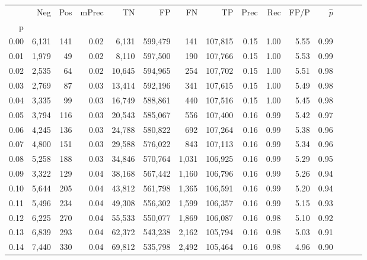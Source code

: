 \begin{tabular}{rrrrrrrrrrrrrrr}
\toprule
{} &     Neg &    Pos & mPrec &       TN &       FP &       FN &       TP &  Prec &   Rec &  FP/P & $\hat{p}$ \\
p    &         &        &       &          &          &          &          &       &       &       &           \\
\midrule
0.00 &   6,131 &    141 &  0.02 &    6,131 &  599,479 &      141 &  107,815 &  0.15 &  1.00 &  5.55 &      0.99 \\
0.01 &   1,979 &     49 &  0.02 &    8,110 &  597,500 &      190 &  107,766 &  0.15 &  1.00 &  5.53 &      0.99 \\
0.02 &   2,535 &     64 &  0.02 &   10,645 &  594,965 &      254 &  107,702 &  0.15 &  1.00 &  5.51 &      0.98 \\
0.03 &   2,769 &     87 &  0.03 &   13,414 &  592,196 &      341 &  107,615 &  0.15 &  1.00 &  5.49 &      0.98 \\
0.04 &   3,335 &     99 &  0.03 &   16,749 &  588,861 &      440 &  107,516 &  0.15 &  1.00 &  5.45 &      0.98 \\
0.05 &   3,794 &    116 &  0.03 &   20,543 &  585,067 &      556 &  107,400 &  0.16 &  0.99 &  5.42 &      0.97 \\
0.06 &   4,245 &    136 &  0.03 &   24,788 &  580,822 &      692 &  107,264 &  0.16 &  0.99 &  5.38 &      0.96 \\
0.07 &   4,800 &    151 &  0.03 &   29,588 &  576,022 &      843 &  107,113 &  0.16 &  0.99 &  5.34 &      0.96 \\
0.08 &   5,258 &    188 &  0.03 &   34,846 &  570,764 &    1,031 &  106,925 &  0.16 &  0.99 &  5.29 &      0.95 \\
0.09 &   3,322 &    129 &  0.04 &   38,168 &  567,442 &    1,160 &  106,796 &  0.16 &  0.99 &  5.26 &      0.94 \\
0.10 &   5,644 &    205 &  0.04 &   43,812 &  561,798 &    1,365 &  106,591 &  0.16 &  0.99 &  5.20 &      0.94 \\
0.11 &   5,496 &    234 &  0.04 &   49,308 &  556,302 &    1,599 &  106,357 &  0.16 &  0.99 &  5.15 &      0.93 \\
0.12 &   6,225 &    270 &  0.04 &   55,533 &  550,077 &    1,869 &  106,087 &  0.16 &  0.98 &  5.10 &      0.92 \\
0.13 &   6,839 &    293 &  0.04 &   62,372 &  543,238 &    2,162 &  105,794 &  0.16 &  0.98 &  5.03 &      0.91 \\
0.14 &   7,440 &    330 &  0.04 &   69,812 &  535,798 &    2,492 &  105,464 &  0.16 &  0.98 &  4.96 &      0.90 \\

\end{tabular}
